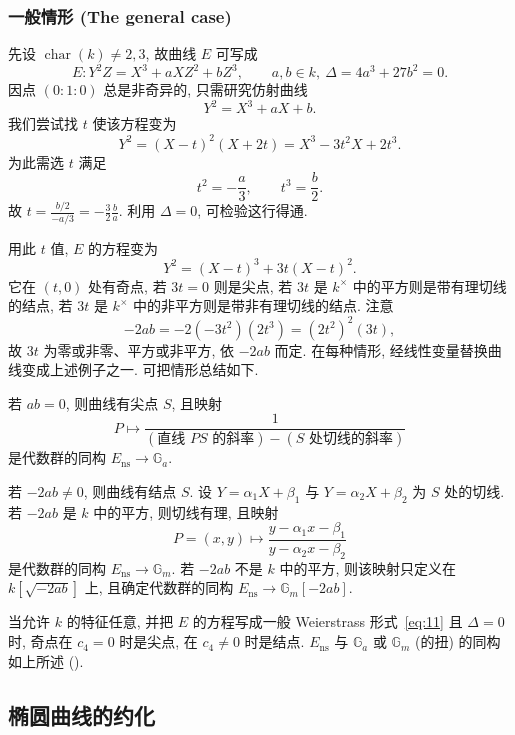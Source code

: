 \subsubsection{一般情形 (The general case)}
先设 $\operatorname{char}(k)\neq 2, 3$, 故曲线 $E$ 可写成
\[
E\colon Y^2Z = X^3 + aXZ^2 + bZ^3, \qquad a,b\in k, \ \Delta = 4a^3 + 27b^2 = 0.
\]
因点 $(0:1:0)$ 总是非奇异的, 只需研究仿射曲线
\[
Y^2 = X^3 + aX + b.
\]
我们尝试找 $t$ 使该方程变为
\[
Y^2 = (X-t)^2(X+2t) = X^3 - 3t^2X + 2t^3.
\]
为此需选 $t$ 满足
\[
t^2 = -\frac{a}{3}, \qquad t^3 = \frac{b}{2}.
\]
故 $t = \frac{b/2}{-a/3} = -\frac{3}{2}\frac{b}{a}$. 利用 $\Delta = 0$, 可检验这行得通.

用此 $t$ 值, $E$ 的方程变为
\[
Y^2 = (X-t)^3 + 3t(X-t)^2.
\]
它在 $(t,0)$ 处有奇点, 若 $3t = 0$ 则是尖点, 若 $3t$ 是 $k^{\times}$ 中的平方则是带有理切线的结点, 若 $3t$ 是 $k^{\times}$ 中的非平方则是带非有理切线的结点. 注意
\[
-2ab = -2(-3t^2)(2t^3) = (2t^2)^2(3t),
\]
故 $3t$ 为零或非零、平方或非平方, 依 $-2ab$ 而定. 在每种情形, 经线性变量替换曲线变成上述例子之一. 可把情形总结如下.

若 $ab = 0$, 则曲线有尖点 $S$, 且映射
\[
P\mapsto\frac{1}{(\text{直线 } PS \text{ 的斜率})-(\text{$S$ 处切线的斜率})}
\]
是代数群的同构 $E_{\mathrm{ns}}\to\mathbb{G}_a$.

若 $-2ab\neq 0$, 则曲线有结点 $S$. 设 $Y = \alpha_1X + \beta_1$ 与 $Y = \alpha_2X + \beta_2$ 为 $S$ 处的切线. 若 $-2ab$ 是 $k$ 中的平方, 则切线有理, 且映射
\[
P = (x,y)\mapsto\frac{y - \alpha_1x - \beta_1}{y - \alpha_2x - \beta_2}
\]
是代数群的同构 $E_{\mathrm{ns}}\to\mathbb{G}_m$. 若 $-2ab$ 不是 $k$ 中的平方, 则该映射只定义在 $k[\sqrt{-2ab}]$ 上, 且确定代数群的同构 $E_{\mathrm{ns}}\to\mathbb{G}_m[-2ab]$.

当允许 $k$ 的特征任意, 并把 $E$ 的方程写成一般 Weierstrass 形式~\eqref{eq:11} 且 $\Delta = 0$ 时, 奇点在 $c_4 = 0$ 时是尖点, 在 $c_4\neq 0$ 时是结点. $E_{\mathrm{ns}}$ 与 $\mathbb{G}_a$ 或 $\mathbb{G}_m$ (的扭) 的同构如上所述 (\cite[p.~182]{tate1974}).

\subsection*{椭圆曲线的约化}

